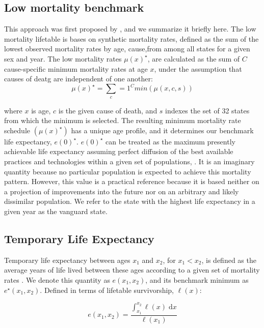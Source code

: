 \documentclass[11.5pt]{article}
\newcommand{\dd}{\; \mathrm{d}}
\begin{document}
\begin{spacing}{1.5}
\subsection*{Low mortality benchmark}
This approach was first proposed by \citet{whelpton1947}, and we summarize it
briefly here. The low mortality lifetable is bases on synthetic mortality rates, defined as the sum of the lowest observed mortality rates by age, cause,from among all states for a given sex and year. The low mortality rates $\mu(x)^\star$, are calculated as the sum of $C$ cause-specific minimum mortality rates at age $x$, under the assumption that causes of deatg are independent of one another:
\begin{equation}
\label{eq:mxmin}
\mu(x)^{\star} = \sum_c=1^C min(\mu(x,c,s))
\end{equation}

where $x$ is age, $c$ is the given cause of death, and $s$ indexes the set of 32 states from which the minimum is selected. The resulting minimum mortality rate schedule $(\mu(x)^{\star})$ has a unique age profile, and it determines our benchmark life expectancy, $e(0)^\star$. $e(0)^\star$ can be treated as the maximum presently achievable life expectancy assuming perfect diffusion of the best available practices and technologies within a given set of populations, \citep{vallin2008minimum}. It is an imaginary quantity because no particular population is expected to achieve this mortality pattern. However, this value is a practical reference because it is based neither on a projection of improvements into the future nor on an arbitrary and likely dissimilar population. We refer to the state with the highest life expectancy in a given year as the vanguard state. 



\subsection*{Temporary Life Expectancy}

Temporary life expectancy between ages
$x_1$ and $x_2$, for $x_1<x_2$, is defined as the average years of life lived between these ages according to a given set of mortality rates \citep{arriaga1984}. We denote this quantity as
$e(x_1,x_2)$, and its benchmark minimum as $e^{\star}(x_1,x_2)$. Defined in
terms of lifetable survivorship, $\ell(x)$:

\begin{equation}
e(x_1,x_2) = \frac{\int _{x_1}^{x_2} \ell(x) \dd x}{\ell(x_1)}
\end{equation}


\end{spacing}
\end{document}
